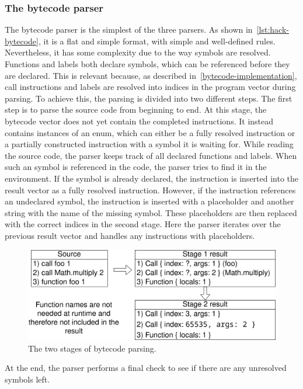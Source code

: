 \subsubsection{The bytecode parser} \label{bytecode-parser}
The bytecode parser is the simplest of the three parsers.
As shown in~\cref{lst:hack-bytecode}, it is a flat and simple format, with simple and well-defined rules.
Nevertheless, it has some complexity due to the way symbols are resolved.
Functions and labels both declare symbols, which can be referenced before they are declared.
This is relevant because, as described in~\cref{bytecode-implementation}, call instructions and labels are resolved into indices in the program vector during parsing.
To achieve this, the parsing is divided into two different steps.
The first step is to parse the source code from beginning to end.
At this stage, the bytecode vector does not yet contain the completed instructions.
It instead contains instances of an enum, which can either be a fully resolved instruction or a partially constructed instruction with a symbol it is waiting for.
While reading the source code, the parser keeps track of all declared functions and labels.
When such an symbol is referenced in the code, the parser tries to find it in the environment.
If the symbol is already declared, the instruction is inserted into the result vector as a fully resolved instruction.
However, if the instruction references an undeclared symbol, the instruction is inserted with a placeholder and another string with the name of the missing symbol.
These placeholders are then replaced with the correct indices in the second stage.
Here the parser iterates over the previous result vector and handles any instructions with placeholders.
\begin{center}
  \begin{figure}[ht]
    \centering
    \includegraphics[width=12cm]{fig/bytecode-parsing.png}
    \caption{The two stages of bytecode parsing.}
    \label{fig:bytecode-parsing}
  \end{figure}
\end{center}
At the end, the parser performs a final check to see if there are any unresolved symbols left.
